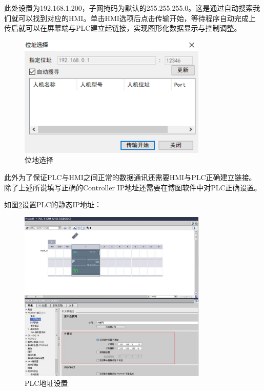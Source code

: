 \documentclass[UTF8]{article}
\begin{document}
此处设置为192.168.1.200，子网掩码为默认的255.255.255.0。这是通过自动搜索我们就可以找到对应的HMI。单击HMI选项后点击传输开始，等待程序自动完成上传后就可以在屏幕端与PLC建立起链接，实现图形化数据显示与控制调整。
\begin{figure}[H]
    \centering %
    \includegraphics[width=0.8\textwidth]{figure/位低选择.png} 
    \caption{位地选择} %
    \label{fig:img18} %
\end{figure}

此外为了保证PLC与HMI之间正常的数据通讯还需要HMI与PLC正确建立链接。除了上述所说填写正确的Controller IP地址还需要在博图软件中对PLC正确设置。

如图\ref{fig:img19}设置PLC的静态IP地址：
\begin{figure}[H]
    \centering %
    \includegraphics[width=0.8\textwidth]{figure/PLC地址设置.png} 
    \caption{PLC地址设置} %
    \label{fig:img19} %
\end{figure}
\end{document}
